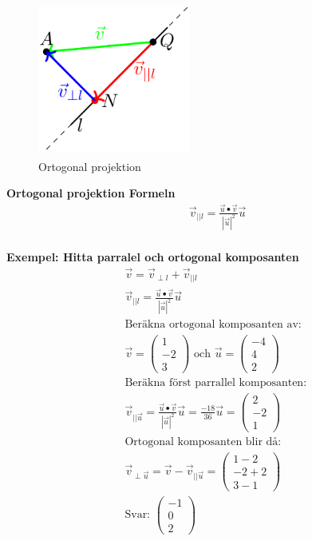 \begin{figure}[h]
    \vspace{10mm}
    \centering
    \includegraphics[width=5cm, height=5cm]{image/Ortogonal-projektion.png} 
    \caption{Ortogonal projektion}
\end{figure}

\textbf{Ortogonal projektion Formeln}
\begin{align*} 
  &\quad  \vec{v}_{||{l}} = \frac{\vec{u}\bullet{\vec{v}}}{|\vec{u}|^2}\vec{u}  \\
\end{align*}

\textbf{Exempel: Hitta parralel och ortogonal komposanten}
\begin{align*} 
  &\quad  \vec{v} = \vec{v}_{\perp{l}} + \vec{v}_{||{l}} \\
  &\quad  \vec{v}_{||{l}} = \frac{\vec{u}\bullet{\vec{v}}}{|\vec{u}|^2}\vec{u}  \\
  &\quad  \text{Beräkna ortogonal komposanten av: } \\
  &\quad
  \vec{v} = \begin{pmatrix} 1 \\ -2 \\ 3 \end{pmatrix} \text{ och }
  \vec{u} = \begin{pmatrix} -4 \\ 4 \\ 2 \end{pmatrix} \\
  &\quad  \text{Beräkna först parrallel komposanten: } \\
  &\quad  \vec{v}_{||{\vec{u}}} = \frac{\vec{u}\bullet{\vec{v}}}{|\vec{u}|^2}\vec{u} = \frac{-18}{36}\vec{u}
  = \begin{pmatrix} 2 \\ -2 \\ 1 \end{pmatrix} \\
  &\quad  \text{Ortogonal komposanten blir då: } \\
  &\quad  \vec{v}_{\perp{\vec{u}}} = \vec{v} - \vec{v}_{||{\vec{u}}}
  = \begin{pmatrix} 1-2 \\ -2+2 \\ 3-1 \end{pmatrix} \\
  &\quad  \text{Svar: } \begin{pmatrix} -1 \\ 0 \\ 2 \end{pmatrix}
\end{align*}

